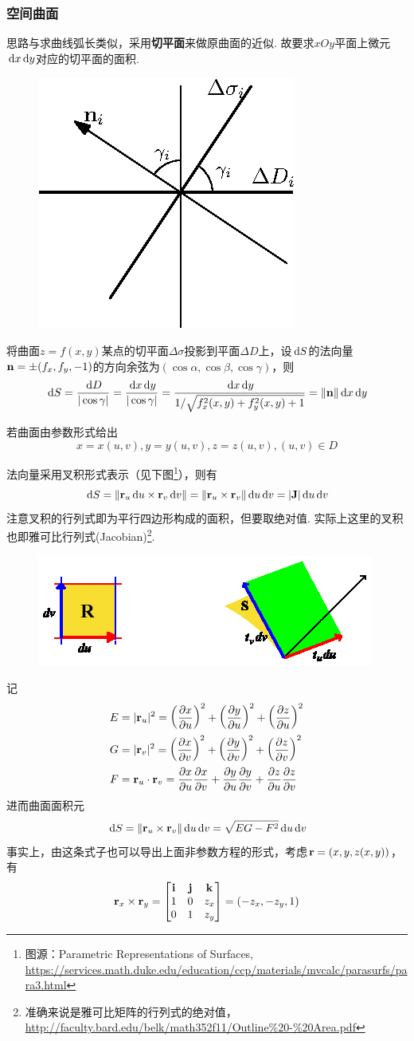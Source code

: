 \subsubsection{空间曲面}
\label{subsubsec:surface_area}
思路与求曲线弧长类似，采用\textbf{切平面}来做原曲面的近似.
故要求$xOy$平面上微元$\,\mathrm{d} x\,\mathrm{d} y$对应的切平面的面积.
\begin{figure}[H]
\centering
\includegraphics[width=0.2\linewidth]{fig/surface_projection.eps}
\end{figure}
\par 将曲面$z=f(x,y)$某点的切平面$\Delta\sigma$投影到平面$\Delta D$上，设$\,\mathrm{d} S$的法向量$\mathbf{n}=\pm(f_x,f_y,-1)$的方向余弦为$(\cos\alpha,\cos\beta,\cos\gamma)$，则
\[\,\mathrm{d} S=\frac{\,\mathrm{d} D}{|\cos\gamma|}=\frac{\,\mathrm{d} x\,\mathrm{d} y}{|\cos\gamma|}=\frac{\,\mathrm{d} x\,\mathrm{d} y}{1/\sqrt{f^2_x(x,y)+f^2_y(x,y)+1}}=\|\mathbf{n}\|\,\mathrm{d} x\,\mathrm{d} y\]
\par 若曲面由参数形式给出
\[x=x(u,v),y=y(u,v),z=z(u,v),(u,v)\in D\]
\par 法向量采用叉积形式表示（见下图\footnote{图源：Parametric Representations of Surfaces, \url{https://services.math.duke.edu/education/ccp/materials/mvcalc/parasurfs/para3.html}}），则有
\[\,\mathrm{d} S=\|\mathbf{r}_u\,\mathrm{d} u\times\mathbf{r}_v\,\mathrm{d} v\|=\|\mathbf{r}_u\times\mathbf{r}_v\|\,\mathrm{d} u\,\mathrm{d} v=|\mathbf{J}|\,\mathrm{d} u\,\mathrm{d} v\]
注意叉积的行列式即为平行四边形构成的面积，但要取绝对值.
实际上这里的叉积也即雅可比行列式(Jacobian)\footnote{准确来说是雅可比矩阵的行列式的绝对值，\url{http://faculty.bard.edu/belk/math352f11/Outline\%20-\%20Area.pdf}}.
\begin{figure}[H]
\centering
\includegraphics[width=0.4\linewidth]{fig/coordinate_projection2.png}
\end{figure}
记
\[\begin{aligned}
E&=|\mathbf{r}_u|^2=\left(\dfrac{\partial x}{\partial u}\right)^2+\left(\dfrac{\partial y}{\partial u}\right)^2+\left(\dfrac{\partial z}{\partial u}\right)^2\\
G&=|\mathbf{r}_v|^2=\left(\dfrac{\partial x}{\partial v}\right)^2+\left(\dfrac{\partial y}{\partial v}\right)^2+\left(\dfrac{\partial z}{\partial v}\right)^2\\
F&=\mathbf{r}_u\cdot\mathbf{r}_v=\dfrac{\partial x}{\partial u}\dfrac{\partial x}{\partial v}+\dfrac{\partial y}{\partial u}\dfrac{\partial y}{\partial v}+\dfrac{\partial z}{\partial u}\dfrac{\partial z}{\partial v}
\end{aligned}\]
进而曲面面积元
\[\,\mathrm{d} S=\|\mathbf{r}_u\times\mathbf{r}_v\|\,\mathrm{d} u\,\mathrm{d} v=\sqrt{EG-F^2}\,\mathrm{d} u\,\mathrm{d} v\]
事实上，由这条式子也可以导出上面非参数方程的形式，考虑$\mathbf{r}=(x,y,z(x,y))$，有
\[\mathbf{r}_x\times\mathbf{r}_y=\begin{bmatrix}\mathbf{i}&\mathbf{j}&\mathbf{k}\\1&0&z_x\\0&1&z_y\end{bmatrix}=(-z_x,-z_y,1)\]


